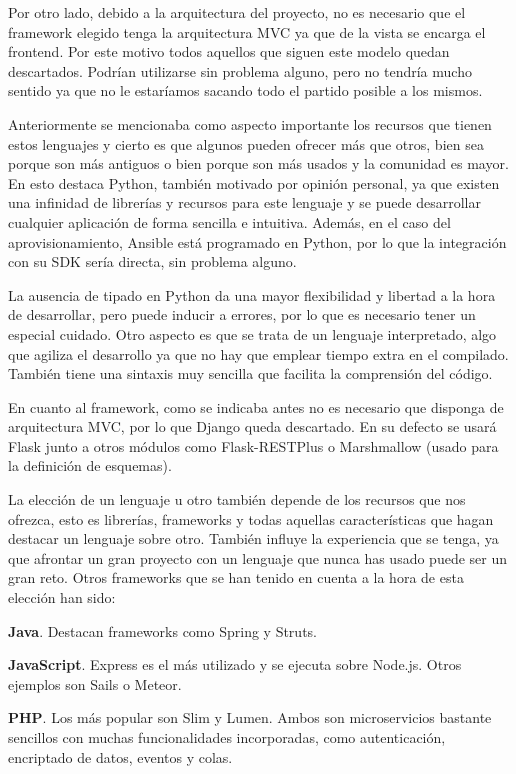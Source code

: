 Por otro lado, debido a la arquitectura del proyecto, no es necesario que el framework elegido tenga la arquitectura MVC ya que de la vista se encarga el frontend. Por este motivo todos aquellos que siguen este modelo quedan descartados. Podrían utilizarse sin problema alguno, pero no tendría mucho sentido ya que no le estaríamos sacando todo el partido posible a los mismos.

Anteriormente se mencionaba como aspecto importante los recursos que tienen estos lenguajes y cierto es que algunos pueden ofrecer más que otros, bien sea porque son más antiguos o bien porque son más usados y la comunidad es mayor. En esto destaca Python, también motivado por opinión personal, ya que existen una infinidad de librerías y recursos para este lenguaje y se puede desarrollar cualquier aplicación de forma sencilla e intuitiva. Además, en el caso del aprovisionamiento, Ansible está programado en Python, por lo que la integración con su SDK sería directa, sin problema alguno.

La ausencia de tipado en Python da una mayor flexibilidad y libertad a la hora de desarrollar, pero puede inducir a errores, por lo que es necesario tener un especial cuidado. Otro aspecto es que se trata de un lenguaje interpretado, algo que agiliza el desarrollo ya que no hay que emplear tiempo extra en el compilado. También tiene una sintaxis muy sencilla que facilita la comprensión del código.

En cuanto al framework, como se indicaba antes no es necesario que disponga de arquitectura MVC, por lo que Django queda descartado. En su defecto se usará Flask junto a otros módulos como Flask-RESTPlus o Marshmallow (usado para la definición de esquemas).

La elección de un lenguaje u otro también depende de los recursos que nos ofrezca, esto es librerías, frameworks y todas aquellas características que hagan destacar un lenguaje sobre otro. También influye la experiencia que se tenga, ya que afrontar un gran proyecto con un lenguaje que nunca has usado puede ser un gran reto. Otros frameworks que se han tenido en cuenta a la hora de esta elección han sido:


\textbf{Java}. Destacan frameworks como Spring y Struts.

\textbf{JavaScript}. Express es el más utilizado y se ejecuta sobre Node.js. Otros ejemplos son Sails o Meteor.

\textbf{PHP}. Los más popular son Slim y Lumen. Ambos son microservicios bastante sencillos con muchas funcionalidades incorporadas, como autenticación, encriptado de datos, eventos y colas.


